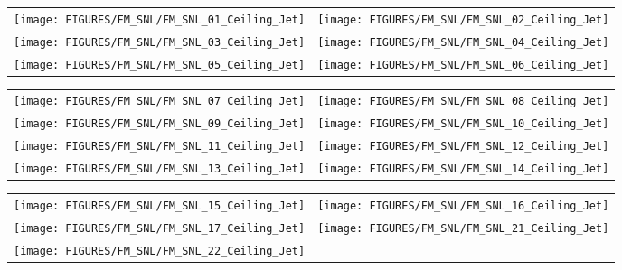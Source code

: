 \begin{figure}[h!]
\begin{tabular*}{\textwidth}{l@{\extracolsep{\fill}}r}
\texttt{[image: FIGURES/FM\_SNL/FM\_SNL\_01\_Ceiling\_Jet]} &
\texttt{[image: FIGURES/FM\_SNL/FM\_SNL\_02\_Ceiling\_Jet]} \\
\texttt{[image: FIGURES/FM\_SNL/FM\_SNL\_03\_Ceiling\_Jet]} &
\texttt{[image: FIGURES/FM\_SNL/FM\_SNL\_04\_Ceiling\_Jet]} \\
\texttt{[image: FIGURES/FM\_SNL/FM\_SNL\_05\_Ceiling\_Jet]} &
\texttt{[image: FIGURES/FM\_SNL/FM\_SNL\_06\_Ceiling\_Jet]} \\
\end{tabular*}
\label{FM_SNL_Ceiling_Jet_1}
\end{figure}

\begin{figure}[h!]
\begin{tabular*}{\textwidth}{l@{\extracolsep{\fill}}r}
\texttt{[image: FIGURES/FM\_SNL/FM\_SNL\_07\_Ceiling\_Jet]} &
\texttt{[image: FIGURES/FM\_SNL/FM\_SNL\_08\_Ceiling\_Jet]} \\
\texttt{[image: FIGURES/FM\_SNL/FM\_SNL\_09\_Ceiling\_Jet]} &
\texttt{[image: FIGURES/FM\_SNL/FM\_SNL\_10\_Ceiling\_Jet]} \\
\texttt{[image: FIGURES/FM\_SNL/FM\_SNL\_11\_Ceiling\_Jet]} &
\texttt{[image: FIGURES/FM\_SNL/FM\_SNL\_12\_Ceiling\_Jet]} \\
\texttt{[image: FIGURES/FM\_SNL/FM\_SNL\_13\_Ceiling\_Jet]} &
\texttt{[image: FIGURES/FM\_SNL/FM\_SNL\_14\_Ceiling\_Jet]} \\
\end{tabular*}
\label{FM_SNL_Ceiling_Jet_2}
\end{figure}

\begin{figure}[h!]
\begin{tabular*}{\textwidth}{l@{\extracolsep{\fill}}r}
\texttt{[image: FIGURES/FM\_SNL/FM\_SNL\_15\_Ceiling\_Jet]} &
\texttt{[image: FIGURES/FM\_SNL/FM\_SNL\_16\_Ceiling\_Jet]} \\
\texttt{[image: FIGURES/FM\_SNL/FM\_SNL\_17\_Ceiling\_Jet]} &
\texttt{[image: FIGURES/FM\_SNL/FM\_SNL\_21\_Ceiling\_Jet]} \\
\texttt{[image: FIGURES/FM\_SNL/FM\_SNL\_22\_Ceiling\_Jet]} \\
\end{tabular*}
\label{FM_SNL_Ceiling_Jet_3}
\end{figure}


